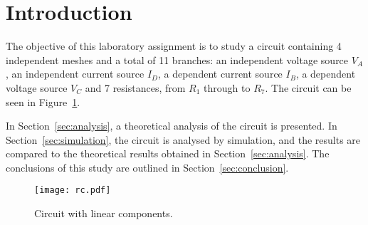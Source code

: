 \section{Introduction}
\label{sec:introduction}

The objective of this laboratory assignment is to study a circuit containing 4 independent meshes and a total of 11 branches: an independent voltage source $V_A$, an independent current source $I_D$, a dependent current source $I_B$, a dependent voltage source $V_C$ and 7 resistances, from $R_1$ through to $R_7$. The circuit can be seen in Figure~\ref{fig:rc}.

In Section~\ref{sec:analysis}, a theoretical analysis of the circuit is
presented. In Section~\ref{sec:simulation}, the circuit is analysed by
simulation, and the results are compared to the theoretical results obtained in
Section~\ref{sec:analysis}. The conclusions of this study are outlined in
Section~\ref{sec:conclusion}.

\begin{figure}[h] \centering
\texttt{[image: rc.pdf]}
\caption{Circuit with linear components.}
\label{fig:rc}
\end{figure}

